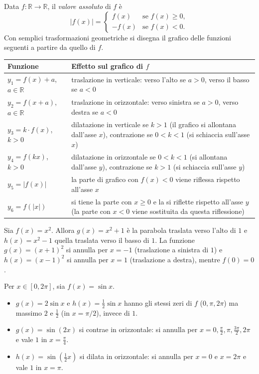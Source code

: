 \documentclass[11pt,a4paper]{article}
\begin{document}
Data $f : \mathbb{R} \to \mathbb{R}$, il \emph{valore assoluto} di $f$ è
\[
|f(x)| =
\begin{cases}
f(x) & \text{se } f(x) \ge 0, \\
-f(x) & \text{se } f(x) < 0.
\end{cases}
\]
Con semplici trasformazioni geometriche si disegna il grafico delle funzioni seguenti a partire da quello di $f$.

\begin{center}
\renewcommand{\arraystretch}{1.3}
\begin{tabular}{@{}lp{9.5cm}@{}}
\toprule
Funzione & Effetto sul grafico di $f$ \\
\midrule
$y_1 = f(x) + a$, $a \in \mathbb{R}$ & traslazione in verticale: verso l'alto se $a > 0$, verso il basso se $a < 0$ \\
$y_2 = f(x + a)$, $a \in \mathbb{R}$ & traslazione in orizzontale: verso sinistra se $a > 0$, verso destra se $a < 0$ \\
$y_3 = k \cdot f(x)$, $k > 0$ & dilatazione in verticale se $k > 1$ (il grafico si allontana dall'asse $x$), contrazione se $0 < k < 1$ (si schiaccia sull'asse $x$) \\
$y_4 = f(kx)$, $k > 0$ & dilatazione in orizzontale se $0 < k < 1$ (si allontana dall'asse $y$), contrazione se $k > 1$ (si schiaccia sull'asse $y$) \\
$y_5 = |f(x)|$ & la parte di grafico con $f(x) < 0$ viene riflessa rispetto all'asse $x$ \\
$y_6 = f(|x|)$ & si tiene la parte con $x \ge 0$ e la si riflette rispetto all'asse $y$ (la parte con $x < 0$ viene sostituita da questa riflessione) \\
\bottomrule
\end{tabular}
\end{center}

\begin{esempio}[Parabola]
Sia $f(x) = x^2$. Allora $g(x) = x^2 + 1$ è la parabola traslata verso l'alto di $1$ e $h(x) = x^2 - 1$ quella traslata verso il basso di $1$. La funzione $g(x) = (x+1)^2$ si annulla per $x = -1$ (traslazione a sinistra di $1$) e $h(x) = (x-1)^2$ si annulla per $x = 1$ (traslazione a destra), mentre $f(0) = 0$.
\end{esempio}

\begin{esempio}[Seno]
Per $x \in [0, 2\pi]$, sia $f(x) = \sin x$.
\begin{itemize}
    \item $g(x) = 2\sin x$ e $h(x) = \tfrac{1}{2}\sin x$ hanno gli stessi zeri di $f$ ($0, \pi, 2\pi$) ma massimo $2$ e $\tfrac12$ (in $x = \pi/2$), invece di $1$.
    \item $g(x) = \sin(2x)$ si contrae in orizzontale: si annulla per $x = 0, \tfrac{\pi}{2}, \pi, \tfrac{3\pi}{2}, 2\pi$ e vale $1$ in $x = \tfrac{\pi}{4}$.
    \item $h(x) = \sin\!\left(\tfrac{1}{2}x\right)$ si dilata in orizzontale: si annulla per $x = 0$ e $x = 2\pi$ e vale $1$ in $x = \pi$.
\end{itemize}
\end{esempio}
\end{document}
